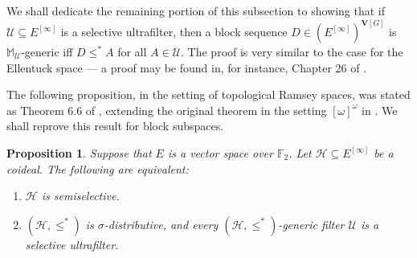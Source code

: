 \documentclass[10pt,a4paper]{amsart}
\theoremstyle{plain}
\numberwithin{equation}{section}
\newtheorem{proposition}[theorem]{Proposition}
\theoremstyle{definition}
\newcommand{\cal}{\mathcal}
\renewcommand{\bf}{\mathbf}
\newcommand{\U}{\cal{U}}
\newcommand{\V}{\bf{V}}
\renewcommand{\H}{\cal{H}}
\begin{document}
We shall dedicate the remaining portion of this subsection to showing that if $\U \subseteq E^{[\infty]}$ is a selective ultrafilter, then a block sequence $D \in (E^{[\infty]})^{\V[G]}$ is $\mathbb{M}_\U$-generic iff $D \leq^* A$ for all $A \in \U$. The proof is very similar to the case for the Ellentuck space --- a proof may be found in, for instance, Chapter 26 of \cite{H22}.

The following proposition, in the setting of topological Ramsey spaces, was stated as Theorem 6.6 of \cite{DMN15}, extending the original theorem in the setting $[\omega]^\omega$ in \cite{F98}. We shall reprove this result for block subspaces.

\begin{proposition}
\label{prop:semiselective.adds.selective.ultrafilter}
    Suppose that $E$ is a vector space over $\mathbb{F}_2$. Let $\H \subseteq E^{[\infty]}$ be a coideal. The following are equivalent:
    \begin{enumerate}
        \item $\H$ is semiselective.
        
        \item $(\H,\leq^*)$ is $\sigma$-distributive, and every $(\H,\leq^*)$-generic filter $\U$ is a selective ultrafilter.
    \end{enumerate}
\end{proposition}
\end{document}
